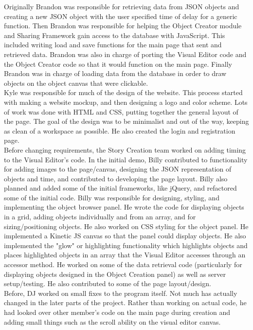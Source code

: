 \documentclass[12pt]{article}
\begin{document}
Originally Brandon was responsible for retrieving data from JSON objects and creating a new JSON object with the user specified time of delay for a generic function.  Then Brandon was responsible for helping the Object Creator module and Sharing Framework gain access to the database with JavaScript.  This included writing load and save functions for the main page that sent and retrieved data.  Brandon was also in charge of porting the Visual Editor code and the Object Creator code so that it would function on the main page.  Finally Brandon was in charge of loading data from the database in order to draw objects on the object canvas that were clickable.  \\

Kyle was responsible for much of the design of the website. This process started with making a website mockup, and then designing a logo and color scheme. Lots of work was done with HTML and CSS, putting together the general layout of the page. The goal of the design was to be minimalist and out of the way, keeping as clean of a workspace as possible. He also created the login and registration page. \\

Before changing requirements, the Story Creation team worked on adding timing to the Visual Editor's code. In the initial demo, Billy contributed to functionality for adding images to the page/canvas, designing the JSON representation of objects and time, and contributed to developing the page layout. Billy also planned and added some of the initial frameworks, like jQuery, and refactored some of the initial code. Billy was responsible for designing, styling, and implementing the object browser panel. He wrote the code for displaying objects in a grid, adding objects individually and from an array, and for sizing/positioning objects. He also worked on CSS styling for the object panel. He implemented a Kinetic JS canvas so that the panel could display objects. He also implemented the "glow" or highlighting functionality which highlights objects and places highlighted objects in an array that the Visual Editor accesses through an accessor method. He worked on some of the data retrieval code (particularly for displaying objects designed in the Object Creation panel) as well as server setup/testing. He also contributed to some of the page layout/design. \\

Before, DJ worked on small fixes to the program itself.  Not much has actually changed in the later parts of the project.  Rather than working on actual code, he had looked over other member's code on the main page during creation and adding small things such as the scroll ability on the visual editor canvas.
\end{document}
